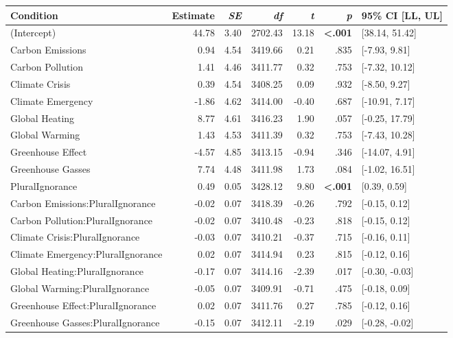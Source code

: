 \begin{table}[ht]
\centering
\begin{tabular}{lrrrrrl}
  \hline
Condition & Estimate & \textit{SE} & \textit{df} & \textit{t} & \textit{p} & 95\% CI [LL, UL] \\ 
  \hline
(Intercept) & 44.78 & 3.40 & 2702.43 & 13.18 & \textbf{\textless  .001} & [38.14, 51.42] \\ 
  Carbon Emissions & 0.94 & 4.54 & 3419.66 & 0.21 & .835 & [-7.93, 9.81] \\ 
  Carbon Pollution & 1.41 & 4.46 & 3411.77 & 0.32 & .753 & [-7.32, 10.12] \\ 
  Climate Crisis & 0.39 & 4.54 & 3408.25 & 0.09 & .932 & [-8.50, 9.27] \\ 
  Climate Emergency & -1.86 & 4.62 & 3414.00 & -0.40 & .687 & [-10.91, 7.17] \\ 
  Global Heating & 8.77 & 4.61 & 3416.23 & 1.90 & .057 & [-0.25, 17.79] \\ 
  Global Warming & 1.43 & 4.53 & 3411.39 & 0.32 & .753 & [-7.43, 10.28] \\ 
  Greenhouse Effect & -4.57 & 4.85 & 3413.15 & -0.94 & .346 & [-14.07, 4.91] \\ 
  Greenhouse Gasses & 7.74 & 4.48 & 3411.98 & 1.73 & .084 & [-1.02, 16.51] \\ 
  PluralIgnorance & 0.49 & 0.05 & 3428.12 & 9.80 & \textbf{\textless  .001} & [0.39, 0.59] \\ 
  Carbon Emissions:PluralIgnorance & -0.02 & 0.07 & 3418.39 & -0.26 & .792 & [-0.15, 0.12] \\ 
  Carbon Pollution:PluralIgnorance & -0.02 & 0.07 & 3410.48 & -0.23 & .818 & [-0.15, 0.12] \\ 
  Climate Crisis:PluralIgnorance & -0.03 & 0.07 & 3410.21 & -0.37 & .715 & [-0.16, 0.11] \\ 
  Climate Emergency:PluralIgnorance & 0.02 & 0.07 & 3414.94 & 0.23 & .815 & [-0.12, 0.16] \\ 
  Global Heating:PluralIgnorance & -0.17 & 0.07 & 3414.16 & -2.39 & .017 & [-0.30, -0.03] \\ 
  Global Warming:PluralIgnorance & -0.05 & 0.07 & 3409.91 & -0.71 & .475 & [-0.18, 0.09] \\ 
  Greenhouse Effect:PluralIgnorance & 0.02 & 0.07 & 3411.76 & 0.27 & .785 & [-0.12, 0.16] \\ 
  Greenhouse Gasses:PluralIgnorance & -0.15 & 0.07 & 3412.11 & -2.19 & .029 & [-0.28, -0.02] \\ 
   \hline
\end{tabular}
\end{table}
